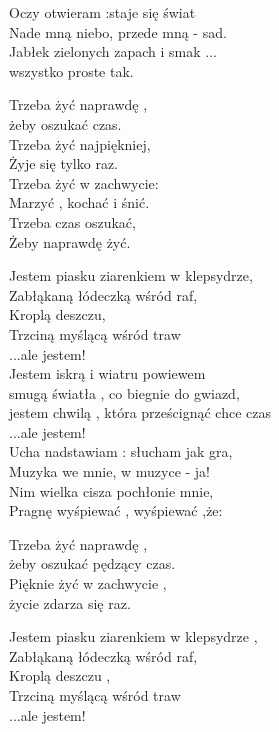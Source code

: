 \begin{text}
    Oczy otwieram :staje się świat\\
    Nade mną niebo, przede mną - sad.\\
    Jabłek zielonych zapach i smak ...\\
    wszystko proste tak.

    Trzeba żyć naprawdę ,\\
    żeby oszukać czas.\\
    Trzeba żyć najpiękniej,\\
    Żyje się tylko raz.\\
    Trzeba żyć w zachwycie:\\
    Marzyć , kochać i śnić.\\
    Trzeba czas oszukać,\\
    Żeby naprawdę żyć.

    Jestem piasku ziarenkiem w klepsydrze,\\
    Zabłąkaną łódeczką wśród raf,\\
    Kroplą deszczu,\\
    Trzciną myślącą wśród traw\\
    ...ale jestem!\\
    Jestem iskrą i wiatru powiewem\\
    smugą światła , co biegnie do gwiazd,\\
    jestem chwilą , która prześcignąć chce czas\\
    ...ale jestem!\\
    Ucha nadstawiam : słucham jak gra,\\
    Muzyka we mnie, w muzyce - ja!\\
    Nim wielka cisza pochłonie mnie,\\
    Pragnę wyśpiewać , wyśpiewać ,że:

    Trzeba żyć naprawdę ,\\
    żeby oszukać pędzący czas.\\
    Pięknie żyć w zachwycie ,\\
    życie zdarza się raz.

    Jestem piasku ziarenkiem w klepsydrze ,\\
    Zabłąkaną łódeczką wśród raf,\\
    Kroplą deszczu ,\\
    Trzciną myślącą wśród traw\\
    ...ale jestem!


\end{text}
